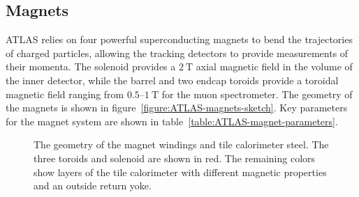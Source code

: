 \subsection{Magnets}\label{sec:ATLAS-magnets}
ATLAS relies on four powerful superconducting magnets to bend the trajectories of charged particles, allowing the tracking detectors to provide measurements of their momenta. The solenoid provides a $2~\mbox{T}$ axial magnetic field in the volume of the inner detector, while the barrel and two endcap toroids provide a toroidal magnetic field ranging from $0.5$--$1~\mbox{T}$ for the muon spectrometer. The geometry of the magnets is shown in figure~\ref{figure:ATLAS-magnets-sketch}. Key parameters for the magnet system are shown in table~\ref{table:ATLAS-magnet-parameters}.

\begin{figure}[htbp]
	\centering
	\caption{The geometry of the magnet windings and tile calorimeter steel. The three toroids and solenoid are shown in red. The remaining colors show layers of the tile calorimeter with different magnetic properties and an outside return yoke.}
	\label{fig:ATLAS_magnets-sketch}
\end{figure}


